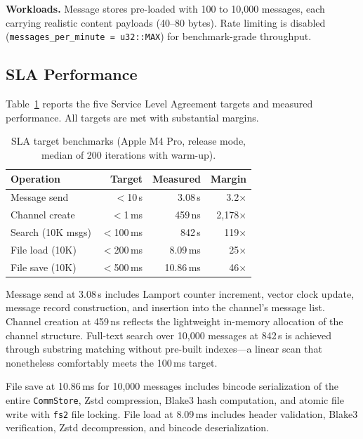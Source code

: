 \documentclass[10pt, twocolumn]{article}
\begin{document}
\textbf{Workloads.} Message stores pre-loaded with 100 to 10{,}000 messages, each carrying realistic content payloads (40--80 bytes). Rate limiting is disabled (\texttt{messages\_per\_minute = u32::MAX}) for benchmark-grade throughput.


\subsection{SLA Performance}

Table~\ref{tab:sla} reports the five Service Level Agreement targets and measured performance. All targets are met with substantial margins.

\begin{table}[t]
\caption{SLA target benchmarks (Apple M4 Pro, release mode, median of 200 iterations with warm-up).}
\label{tab:sla}
\centering
\small
\begin{tabular}{@{}lrrr@{}}
\toprule
\textbf{Operation} & \textbf{Target} & \textbf{Measured} & \textbf{Margin} \\
\midrule
Message send & $<$10\,\textmu{}s & 3.08\,\textmu{}s & 3.2$\times$ \\
Channel create & $<$1\,ms & 459\,ns & 2{,}178$\times$ \\
Search (10K msgs) & $<$100\,ms & 842\,\textmu{}s & 119$\times$ \\
File load (10K) & $<$200\,ms & 8.09\,ms & 25$\times$ \\
File save (10K) & $<$500\,ms & 10.86\,ms & 46$\times$ \\
\bottomrule
\end{tabular}
\end{table}

Message send at 3.08\,\textmu{}s includes Lamport counter increment, vector clock update, message record construction, and insertion into the channel's message list. Channel creation at 459\,ns reflects the lightweight in-memory allocation of the channel structure. Full-text search over 10{,}000 messages at 842\,\textmu{}s is achieved through substring matching without pre-built indexes---a linear scan that nonetheless comfortably meets the 100\,ms target.

File save at 10.86\,ms for 10{,}000 messages includes bincode serialization of the entire \texttt{CommStore}, Zstd compression, Blake3 hash computation, and atomic file write with \texttt{fs2} file locking. File load at 8.09\,ms includes header validation, Blake3 verification, Zstd decompression, and bincode deserialization.
\end{document}
